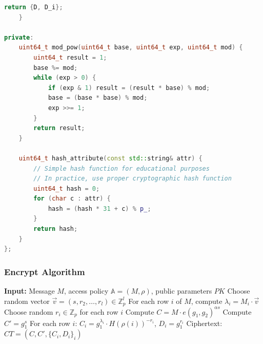 \documentclass[11pt,a4paper]{article}
\begin{document}
\begin{lstlisting}[language=C++, caption=CP-ABE KeyGen Implementation]
        return {D, D_i};
    }
    
private:
    uint64_t mod_pow(uint64_t base, uint64_t exp, uint64_t mod) {
        uint64_t result = 1;
        base %= mod;
        while (exp > 0) {
            if (exp & 1) result = (result * base) % mod;
            base = (base * base) % mod;
            exp >>= 1;
        }
        return result;
    }
    
    uint64_t hash_attribute(const std::string& attr) {
        // Simple hash function for educational purposes
        // In practice, use proper cryptographic hash function
        uint64_t hash = 0;
        for (char c : attr) {
            hash = (hash * 31 + c) % p_;
        }
        return hash;
    }
};
\end{lstlisting}

\subsubsection{Encrypt Algorithm}

\begin{algorithm}
\caption{CP-ABE Encrypt}
\begin{algorithmic}
\STATE \textbf{Input:} Message $M$, access policy $\mathbb{A} = (M, \rho)$, public parameters $PK$
\STATE Choose random vector $\vec{v} = (s, r_2, \ldots, r_l) \in \mathbb{Z}_p^l$
\STATE For each row $i$ of $M$, compute $\lambda_i = M_i \cdot \vec{v}$
\STATE Choose random $r_i \in \mathbb{Z}_p$ for each row $i$
\STATE Compute $C = M \cdot e(g_1, g_2)^{\alpha s}$
\STATE Compute $C' = g_1^s$
\STATE For each row $i$: $C_i = g_1^{\lambda_i} \cdot H(\rho(i))^{-r_i}$, $D_i = g_1^{r_i}$
\STATE Ciphertext: $CT = (C, C', \{C_i, D_i\}_{i})$
\end{algorithmic}
\end{algorithm}
\end{document}
